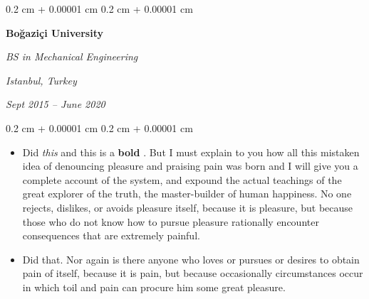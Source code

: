 \documentclass[10pt, letterpaper]{article}
\newenvironment{highlights}{
    \begin{itemize}[
        topsep=0.10 cm,
        parsep=0.10 cm,
        partopsep=0pt,
        itemsep=0pt,
        leftmargin=0.4 cm + 10pt
    ]
}{
    \end{itemize}
} %
\newenvironment{onecolentry}{
    \begin{adjustwidth}{
        0.2 cm + 0.00001 cm
    }{
        0.2 cm + 0.00001 cm
    }
}{
    \end{adjustwidth}
} %
\newenvironment{twocolentry}[2][]{
    \onecolentry
    \def\secondColumn{#2}
    \setcolumnwidth{\fill, 4.5 cm}
    \begin{paracol}{2}
}{
    \switchcolumn \raggedleft \secondColumn
    \end{paracol}
    \endonecolentry
} %
\let\hrefWithoutArrow\href
\renewcommand{\href}[2]{\hrefWithoutArrow{#1}{\ifthenelse{\equal{#2}{}}{ }{#2 }\raisebox{.15ex}{\footnotesize \faExternalLink*}}}
\begin{document}
        \vspace{0.2 cm}

        \begin{twocolentry}{
        \textit{Istanbul, Turkey}    
            
        \textit{Sept 2015 – June 2020}}
            \textbf{Boğaziçi University}

            \textit{BS in Mechanical Engineering}
        \end{twocolentry}
        \vspace{0.10 cm}
        \begin{onecolentry}
            \begin{highlights}
                \item Did \textit{this} and this is a \textbf{bold} \href{https://example.com}{link}. But I must explain to you how all this mistaken idea of denouncing pleasure and praising pain was born and I will give you a complete account of the system, and expound the actual teachings of the great explorer of the truth, the master-builder of human happiness. No one rejects, dislikes, or avoids pleasure itself, because it is pleasure, but because those who do not know how to pursue pleasure rationally encounter consequences that are extremely painful.
                \item Did that. Nor again is there anyone who loves or pursues or desires to obtain pain of itself, because it is pain, but because occasionally circumstances occur in which toil and pain can procure him some great pleasure.
            \end{highlights}
        \end{onecolentry}


        \vspace{0.2 cm}
\end{document}

